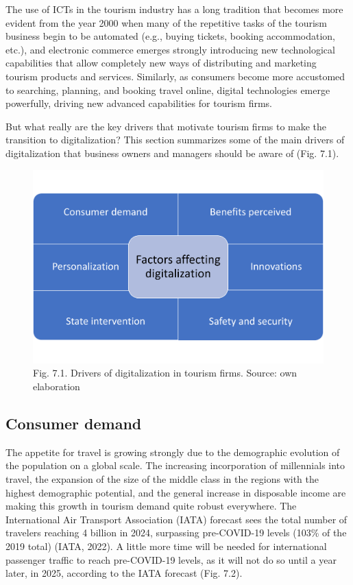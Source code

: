 \documentclass[
  letterpaper,
  DIV=11,
  numbers=noendperiod]{scrreprt}
\begin{document}
The use of ICTs in the tourism industry has a long tradition that
becomes more evident from the year 2000 when many of the repetitive
tasks of the tourism business begin to be automated (e.g., buying
tickets, booking accommodation, etc.), and electronic commerce emerges
strongly introducing new technological capabilities that allow
completely new ways of distributing and marketing tourism products and
services. Similarly, as consumers become more accustomed to searching,
planning, and booking travel online, digital technologies emerge
powerfully, driving new advanced capabilities for tourism firms.

But what really are the key drivers that motivate tourism firms to make
the transition to digitalization? This section summarizes some of the
main drivers of digitalization that business owners and managers should
be aware of (Fig. 7.1).

\begin{figure}

{\centering \includegraphics{img/fig4.png}

}

\caption{Fig. 7.1. Drivers of digitalization in tourism firms. Source:
own elaboration}

\end{figure}

\hypertarget{consumer-demand}{%
\subsection{Consumer demand}\label{consumer-demand}}

The appetite for travel is growing strongly due to the demographic
evolution of the population on a global scale. The increasing
incorporation of millennials into travel, the expansion of the size of
the middle class in the regions with the highest demographic potential,
and the general increase in disposable income are making this growth in
tourism demand quite robust everywhere. The International Air Transport
Association (IATA) forecast sees the total number of travelers reaching
4 billion in 2024, surpassing pre-COVID-19 levels (103\% of the 2019
total) (IATA, 2022). A little more time will be needed for international
passenger traffic to reach pre-COVID-19 levels, as it will not do so
until a year later, in 2025, according to the IATA forecast (Fig. 7.2).
\end{document}
